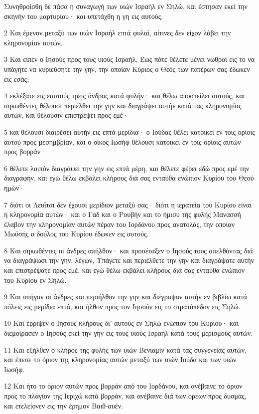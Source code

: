 \par Συνηθροίσθη δε πάσα η συναγωγή των υιών Ισραήλ εν Σηλώ, και έστησαν εκεί την σκηνήν του μαρτυρίου· και υπετάχθη η γη εις αυτούς.
\par 2 Και έμενον μεταξύ των υιών Ισραήλ επτά φυλαί, αίτινες δεν είχον λάβει την κληρονομίαν αυτών.
\par 3 Και είπεν ο Ιησούς προς τους υιούς Ισραήλ, Έως πότε θέλετε μένει νωθροί εις το να υπάγητε να κυριεύσητε την γην, την οποίαν Κύριος ο Θεός των πατέρων σας έδωκεν εις εσάς;
\par 4 εκλέξατε εις εαυτούς τρεις άνδρας κατά φυλήν· και θέλω αποστείλει αυτούς, και σηκωθέντες θέλουσι περιέλθει την γην και διαγράψει αυτήν κατά τας κληρονομίας αυτών, και θέλουσιν επιστρέψει προς εμέ·
\par 5 και θέλουσι διαιρέσει αυτήν εις επτά μερίδια· ο Ιούδας θέλει κατοικεί εν τοις ορίοις αυτού προς μεσημβρίαν, και ο οίκος Ιωσήφ θέλουσι κατοικεί εν τοις ορίοις αυτών προς βορράν·
\par 6 θέλετε λοιπόν διαγράψει την γην εις επτά μέρη, και θέλετε φέρει εδώ προς εμέ την διαγραφήν, και εγώ θέλω εκβάλει κλήρους διά σας ενταύθα ενώπιον Κυρίου του Θεού ημών·
\par 7 διότι οι Λευΐται δεν έχουσι μερίδιον μεταξύ σας· διότι η ιερατεία του Κυρίου είναι η κληρονομία αυτών· και ο Γαδ και ο Ρουβήν και το ήμισυ της φυλής Μανασσή έλαβον την κληρονομίαν αυτών πέραν του Ιορδάνου προς ανατολάς, την οποίαν Μωϋσής ο δούλος του Κυρίου έδωκεν εις αυτούς.
\par 8 Και σηκωθέντες οι άνδρες απήλθον· και προσέταξεν ο Ιησούς τους απελθόντας διά να διαγράψωσι την γην, λέγων, Υπάγετε και περιέλθετε την γην και διαγράψατε αυτήν και επιστρέψατε προς εμέ, και εγώ θέλω εκβάλει κλήρους διά σας ενταύθα ενώπιον του Κυρίου εν Σηλώ.
\par 9 Και υπήγαν οι άνδρες και περιήλθον την γην και διέγραψαν αυτήν εν βιβλίω κατά πόλεις εις μερίδια επτά, και ήλθον προς τον Ιησούν εις το στρατόπεδον εις Σηλώ.
\par 10 Και έρριψεν ο Ιησούς κλήρους δι' αυτούς εν Σηλώ ενώπιον του Κυρίου· και διεμοίρασεν ο Ιησούς εκεί την γην εις τους υιούς Ισραήλ κατά τους μερισμούς αυτών.
\par 11 Και εξήλθεν ο κλήρος της φυλής των υιών Βενιαμίν κατά τας συγγενείας αυτών, και έπεσε το όριον της κληρονομίας αυτών μεταξύ των υιών Ιούδα και των υιών Ιωσήφ.
\par 12 Και ήτο το όριον αυτών προς βορράν από του Ιορδάνου, και ανέβαινε το όριον προς το πλάγιον της Ιεριχώ κατά βορράν, και ανέβαινε διά των ορέων προς δυσμάς, και ετελείονεν εις την έρημον Βαιθ-αυέν.
